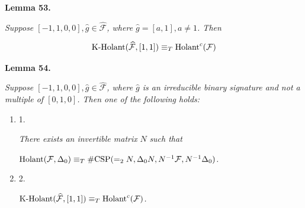 \documentclass[10pt,a4paper]{article}
\begin{document}


\par\medskip\noindent\textbf{
\textbf{Lemma 53}\textbf{.}
}\par



\emph{Suppose $[-1,1,0,0],\widehat{g}\in\widehat{\mathcal{F}}$, where $\widehat{g}=[a,1],a\neq 1$. Then}\par


\[\begin{gathered}
\textup{{K-Holant}}(\widehat{\mathcal{F}},[1,1])\equiv_{T}\textup{{Holant}}^{c}(\mathcal{F})
\end{gathered}\]







\par\medskip\noindent\textbf{
\textbf{Lemma 54}\textbf{.}
}\par



\emph{Suppose $[-1,1,0,0],\widehat{g}\in\widehat{\mathcal{F}}$, where $\widehat{g}$ is an irreducible binary signature and not a multiple of $[0,1,0]$. Then one of the following holds:}\par


\begin{enumerate}


\item[] 
1. 


\emph{There exists an invertible matrix }$N$\emph{ such that}\par




$\textup{{Holant}}(\mathcal{F},\Delta_{0})\equiv_{T}\textup{{\#CSP}}(=_{2}N,\Delta_{0}N,N^{-1}\mathcal{F},N^{-1}\Delta_{0})$\emph{.}\par





\item[] 
2. 


$\textup{{K-Holant}}(\widehat{\mathcal{F}},[1,1])\equiv_{T}\textup{{Holant}}^{c}(\mathcal{F})$\emph{.}\par





\end{enumerate}
\end{document}
